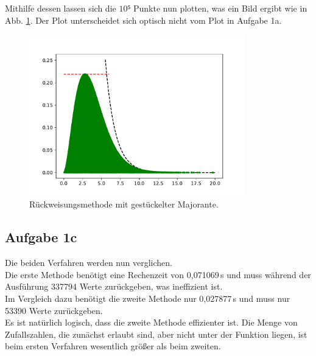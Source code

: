       Mithilfe dessen lassen sich die $10⁵$ Punkte nun plotten, was
      ein Bild ergibt wie in Abb. \ref{fig:majorante}.
      Der Plot unterscheidet sich optisch nicht vom Plot in Aufgabe 1a.



      \begin{figure}[H]
        \centering
        \includegraphics[height=7cm]{majorante.pdf}
        \caption{Rückweisungsmethode mit gestückelter Majorante.}
        \label{fig:majorante}
      \end{figure}




    \subsection{Aufgabe 1c}

      Die beiden Verfahren werden nun verglichen. \\
      Die erste Methode benötigt eine Rechenzeit von 0,071069\,s und
      muss während der Ausführung 337794 Werte zurückgeben, was ineffizient ist.\\
      Im Vergleich dazu benötigt die zweite Methode nur 0,027877\,s und
      muss nur 53390 Werte zurückgeben.\\
      Es ist natürlich logisch, dass die
      zweite Methode effizienter ist. Die Menge von Zufallszahlen, die
      zunächst erlaubt sind, aber nicht unter der Funktion liegen, ist beim
      ersten Verfahren wesentlich größer als beim zweiten.


